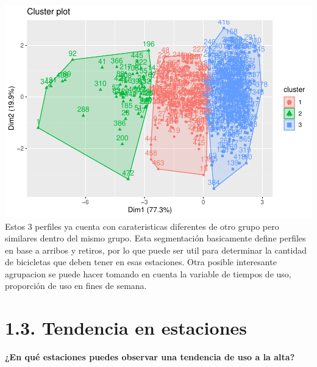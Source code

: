 \documentclass[
]{article}
\begin{document}
\includegraphics{Ecobici_files/figure-latex/unnamed-chunk-15-1.pdf}
Estos 3 perfiles ya cuenta con carateristicas diferentes de otro grupo
pero similares dentro del mismo grupo. Esta segmentación basicamente
define perfiles en base a arribos y retiros, por lo que puede ser util
para determinar la cantidad de bicicletas que deben tener en esas
estaciones. Otra posible interesante agrupacion se puede hacer tomando
en cuenta la variable de tiempos de uso, proporción de uso en fines de
semana.

\hypertarget{tendencia-en-estaciones}{%
\section{1.3. Tendencia en estaciones}\label{tendencia-en-estaciones}}

\textbf{¿En qué estaciones puedes observar una tendencia de uso a la
alta?}
\end{document}

